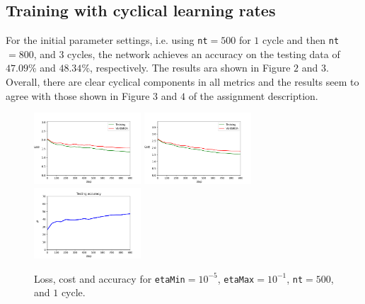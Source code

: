 \documentclass{article}
\begin{document}
\subsection*{Training with cyclical learning rates}
	For the initial parameter settings, i.e. using \texttt{nt}$=500$ for $1$ cycle and then \texttt{nt}$=800$, and $3$ cycles, the network achieves an accuracy on the testing data of $47.09$\% and $48.34$\%, respectively. The results ara shown in Figure $2$ and $3$. Overall, there are clear cyclical components in all metrics and the results seem to agree with those shown in Figure $3$ and $4$ of the assignment description.
	\begin{figure}[h!]
		\centering
		\includegraphics[width=4cm]{../plots/loss_init_v1.png}
		\includegraphics[width=4cm]{../plots/cost_init_v1.png}
		\includegraphics[width=4cm]{../plots/acc_init_v1.png}
		\caption{Loss, cost and accuracy for \texttt{etaMin}$=10^{-5}$, \texttt{etaMax}$=10^{-1}$, \texttt{nt}$=500$, and $1$ cycle.}
	\end{figure}		
\end{document}
